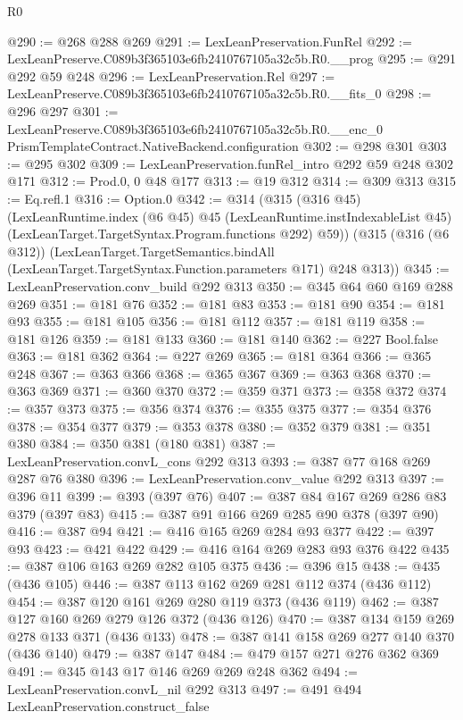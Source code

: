 \begin{lexlean}{R0}
\begin{coremodule}
@290 := @268 @288 @269
@291 := LexLeanPreservation.FunRel
@292 := LexLeanPreserve.C089b3f365103e6fb2410767105a32c5b.R0.__prog
@295 := @291 @292 @59 @248
@296 := LexLeanPreservation.Rel
@297 := LexLeanPreserve.C089b3f365103e6fb2410767105a32c5b.R0.__fits_0
@298 := @296 @297
@301 := LexLeanPreserve.C089b3f365103e6fb2410767105a32c5b.R0.__enc_0
    PrismTemplateContract.NativeBackend.configuration
@302 := @298 @301
@303 := @295 @302
@309 := LexLeanPreservation.funRel_intro @292 @59 @248 @302 @171
@312 := Prod.{0, 0} @48 @177
@313 := @19 @312
@314 := @309 @313
@315 := Eq.refl.{1}
@316 := Option.{0}
@342 := @314
    (@315
      (@316 @45)
      (LexLeanRuntime.index
        (@6 @45)
        @45
        (LexLeanRuntime.instIndexableList @45)
        (LexLeanTarget.TargetSyntax.Program.functions @292)
        @59))
    (@315
      (@316 (@6 @312))
      (LexLeanTarget.TargetSemantics.bindAll
        (LexLeanTarget.TargetSyntax.Function.parameters @171)
        @248
        @313))
@345 := LexLeanPreservation.conv_build @292 @313
@350 := @345 @64 @60 @169 @288 @269
@351 := @181 @76
@352 := @181 @83
@353 := @181 @90
@354 := @181 @93
@355 := @181 @105
@356 := @181 @112
@357 := @181 @119
@358 := @181 @126
@359 := @181 @133
@360 := @181 @140
@362 := @227 Bool.false
@363 := @181 @362
@364 := @227 @269
@365 := @181 @364
@366 := @365 @248
@367 := @363 @366
@368 := @365 @367
@369 := @363 @368
@370 := @363 @369
@371 := @360 @370
@372 := @359 @371
@373 := @358 @372
@374 := @357 @373
@375 := @356 @374
@376 := @355 @375
@377 := @354 @376
@378 := @354 @377
@379 := @353 @378
@380 := @352 @379
@381 := @351 @380
@384 := @350 @381 (@180 @381)
@387 := LexLeanPreservation.convL_cons @292 @313
@393 := @387 @77 @168 @269 @287 @76 @380
@396 := LexLeanPreservation.conv_value @292 @313
@397 := @396 @11
@399 := @393 (@397 @76)
@407 := @387 @84 @167 @269 @286 @83 @379 (@397 @83)
@415 := @387 @91 @166 @269 @285 @90 @378 (@397 @90)
@416 := @387 @94
@421 := @416 @165 @269 @284 @93 @377
@422 := @397 @93
@423 := @421 @422
@429 := @416 @164 @269 @283 @93 @376 @422
@435 := @387 @106 @163 @269 @282 @105 @375
@436 := @396 @15
@438 := @435 (@436 @105)
@446 := @387 @113 @162 @269 @281 @112 @374 (@436 @112)
@454 := @387 @120 @161 @269 @280 @119 @373 (@436 @119)
@462 := @387 @127 @160 @269 @279 @126 @372 (@436 @126)
@470 := @387 @134 @159 @269 @278 @133 @371 (@436 @133)
@478 := @387 @141 @158 @269 @277 @140 @370 (@436 @140)
@479 := @387 @147
@484 := @479 @157 @271 @276 @362 @369
@491 := @345 @143 @17 @146 @269 @269 @248 @362
@494 := LexLeanPreservation.convL_nil @292 @313
@497 := @491 @494 LexLeanPreservation.construct_false

\end{coremodule}
\end{lexlean}
